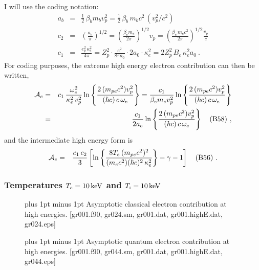\documentclass[preprint,12pt,eqsecnum,nofootinbib,amsmath,amssymb]{revtex4}
\newcommand{\smI}{{\rm\scriptscriptstyle I}}
\newcommand{\footnoteskip}{\baselineskip 12pt plus 1pt minus 1pt}
\begin{document}
I will use the coding notation: 
\begin{eqnarray}
  a_b 
  &=&
  \frac{1}{2}\, \beta_b m_b v_p^2
  =
\frac{1}{2}\, \beta_b\, m_b c^2 \,\left( v_p^2/c^2\right)
\\[5pt]
  c_2 
  &=& 
  \left(\frac{a_e}{\pi}\right)^{1/2} 
  =
  \left( \frac{\beta_e m_e}{2\pi}\right)^{1/2}v_p
  =
  \left( \frac{\beta_e\, m_e c^2}{2\pi}\right)^{1/2} \frac{v_p}{c}
\\[5pt]
  c_1 
  &=&
  \frac{e_p^2 \, \kappa_e^2}{4\pi}
  =
  Z_p^2 \cdot \frac{e^2}{8\pi a_0} \cdot 2 a_0 \cdot \kappa_e^2
  =
  2 Z_p^2 \, B_e\, \kappa_e^2 a_0 \ .
\end{eqnarray}
For coding purposes, the extreme high energy electron contribution can
then be written,
\begin{eqnarray}
  {\cal A}_e
  &=&
  c_1 \, \frac{\omega_e^2}{\kappa_e^2\,v_p^2}
  \ln\left\{ \frac{2 \,(m_{pe} c^2) v_p^2}{(\hbar c)\, c\,
  \omega_e}\right\} 
  =
  \frac{c_1}{\beta_e m_e v_p^2}
  \ln\left\{ \frac{2 \,(m_{pe} c^2) v_p^2}{(\hbar c)\, c\,
  \omega_e}\right\} 
\\
  &=&
  \frac{c_1}{2 a_e}
  \ln\left\{ \frac{2 \,(m_{pe} c^2) v_p^2}{(\hbar c)\, c\,
  \omega_e}\right\} 
  ~~~\text{(B58)} \ ,
\end{eqnarray}
and the intermediate high energy form is
\begin{eqnarray}
  {\cal A}_e
  &=&
  \frac{c_1\,c_2}{3}
  \left[ \ln\left\{ \frac{8 T_e\, (m_{pe} c^2)^2}{(m_e c^2) (\hbar c)^2\, \kappa_e^2}\right\} 
  - \gamma  -1\right]
  ~~~\text{(B56)} \ .
\end{eqnarray}



\pagebreak
\subsubsection{Temperatures $T_e=10\,{\rm keV}$ and $T_\smI=10\,{\rm keV}$}

\begin{figure}[h!]
\caption{\footnoteskip  
  Asymptotic classical electron contribution at high
  energies. [gr001.f90, gr024.sm, gr001.dat, 
  gr001.highE.dat, gr024.eps]
}
\label{fig:gr024}
\end{figure}

\begin{figure}[h!]
\vskip-0.8cm 
\caption{\footnoteskip  
  Asymptotic quantum electron contribution at high
  energies. [gr001.f90, gr044.sm, gr001.dat, gr001.highE.dat,
  gr044.eps]
}
\label{fig:gr044}
\end{figure}
\end{document}
